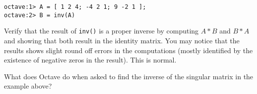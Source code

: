 \begin{verbatim}
octave:1> A = [ 1 2 4; -4 2 1; 9 -2 1 ];
octave:2> B = inv(A)
\end{verbatim}

Verify that the result of \texttt{inv()} is a proper inverse by computing $A*B$ and $B*A$ and
showing that both result in the identity matrix. You may notice that the results shows slight
round off errors in the computations (mostly identified by the existence of negative zeros in
the result). This is normal.

What does Octave do when asked to find the inverse of the singular matrix in the example above?
